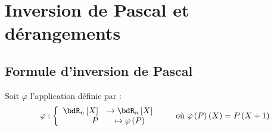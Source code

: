 \documentclass[a4paper,french,bookmarks]{article}
\begin{document}

\section*{Inversion de Pascal et dérangements}

\subsection{Formule d'inversion de Pascal}\label{subsec:1}

Soit $\varphi$ l'application définie par :
%
\[ \varphi : \left\lbrace\begin{array}{rcl}
    \bdR_n\left[X\right] &\to \bdR_n\left[X\right]  \\
    P &\mapsto \varphi\left(P\right) 
\end{array}\right. \qquad\text{où} \ \varphi\left(P\right)\left(X\right) = P\left(X+1\right) \]
\end{document}
